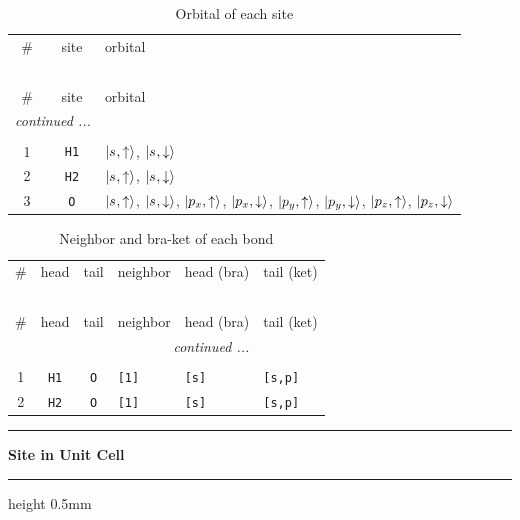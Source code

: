 \documentclass[fleqn,10pt,landscape]{jsarticle}
\begin{document}
\renewcommand{\arraystretch}{1.6}
\begin{longtable}[l]{ccl}
\captionsetup{justification=raggedright, singlelinecheck=off}
\caption{Orbital of each site}
 \\
 \hline \hline
\# & site & orbital \\ \hline \endfirsthead

\multicolumn{2}{l}{\tablename\ \thetable{}} \\
 \hline \hline
\# & site & orbital \\ \hline \endhead

 \hline \hline
\multicolumn{2}{r}{\footnotesize\it continued ...} \\ \endfoot

 \hline \hline
\multicolumn{2}{r}{} \\ \endlastfoot

1 & \texttt{H1} & $\ket{s_{},\uparrow}$, $\ket{s_{},\downarrow}$ \\ \hline
2 & \texttt{H2} & $\ket{s_{},\uparrow}$, $\ket{s_{},\downarrow}$ \\ \hline
3 & \texttt{O} & $\ket{s_{},\uparrow}$, $\ket{s_{},\downarrow}$, $\ket{p_{x},\uparrow}$, $\ket{p_{x},\downarrow}$, $\ket{p_{y},\uparrow}$, $\ket{p_{y},\downarrow}$, $\ket{p_{z},\uparrow}$, $\ket{p_{z},\downarrow}$ \\
\end{longtable}
\renewcommand{\arraystretch}{1.6}
\begin{longtable}[l]{ccclll}
\captionsetup{justification=raggedright, singlelinecheck=off}
\caption{Neighbor and bra-ket of each bond}
 \\
 \hline \hline
\# & head & tail & neighbor & head (bra) & tail (ket) \\ \hline \endfirsthead

\multicolumn{5}{l}{\tablename\ \thetable{}} \\
 \hline \hline
\# & head & tail & neighbor & head (bra) & tail (ket) \\ \hline \endhead

 \hline \hline
\multicolumn{5}{r}{\footnotesize\it continued ...} \\ \endfoot

 \hline \hline
\multicolumn{5}{r}{} \\ \endlastfoot

1 & \texttt{H1} & \texttt{O} & \texttt{[1]} & \texttt{[s]} & \texttt{[s,p]} \\ \hline
2 & \texttt{H2} & \texttt{O} & \texttt{[1]} & \texttt{[s]} & \texttt{[s,p]} \\
\end{longtable}
\vspace{5mm}
\noindent \rule[0.5mm]{5mm}{0.5mm}\hspace{3mm}\textbf{Site in Unit Cell}\hspace{3mm}\leaders\hrule height 0.5mm\hfill\kern0pt
\vspace{3mm}
\end{document}
